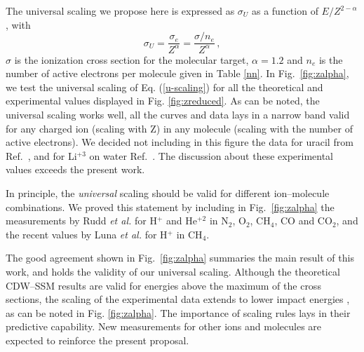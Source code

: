 \documentclass[10pt,showpacs,showkeys,twocolumn]{revtex4}
\begin{document}
 
The universal scaling we propose here is expressed as $\sigma_U$ as a function of $E/Z^{2-\alpha}$, with
 \begin{equation}
     \sigma_U=\frac{\sigma_e}{Z^{\alpha}}=\frac{\sigma/n_e}{Z^{\alpha}}\,,
     \label{u-scaling}
 \end{equation}
$\sigma$ is the ionization cross section for the molecular target, $\alpha=1.2$ and $n_e$ is the number of active electrons per molecule given in Table \ref{nn}. %
In Fig.~\ref{fig:zalpha}, we test the universal scaling of Eq. (\ref{u-scaling}) %
for all the theoretical and experimental values displayed in Fig. \ref{fig:zreduced}. 
As can be noted, the universal scaling works well, all the curves and data lays in a narrow band valid for any charged ion (scaling with Z) in any molecule (scaling with the number of active electrons). We decided not including in this figure the data for uracil from Ref.~\cite{agnihotri2012,agnihotri2013}, and for Li$^{+3}$ on water Ref.~\cite{Luna_Li_water}. The discussion about these experimental values exceeds the present work. %


In principle, the \textit{universal} scaling should be valid for different ion--molecule combinations. 
We proved this statement by including in Fig.~\ref{fig:zalpha} the measurements by Rudd \textit{et al.} \cite{Rudd85,Rudd1983} for H$^{+}$ and He$^{+2}$ in N$_2$, O$_2$, CH$_4$, CO and CO$_2$, and the recent values by Luna \textit{et al.} \cite{Luna2019} for H$^{+}$ in CH$_4$. 

The good agreement shown in Fig.~\ref{fig:zalpha} summaries the main result of this work, and holds the validity of our universal scaling. Although the theoretical CDW--SSM results  %
are valid for energies above the maximum of the cross sections, the scaling of the experimental data extends to lower impact energies%
, as can be noted in Fig. \ref{fig:zalpha}.
The importance of scaling rules lays in their predictive capability. New measurements for other ions and molecules are expected to reinforce the present proposal. 

\end{document}
